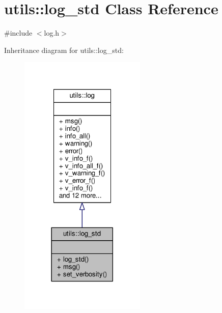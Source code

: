 \hypertarget{classutils_1_1log__std}{\section{utils\-:\-:log\-\_\-std Class Reference}
\label{classutils_1_1log__std}
}


{\ttfamily \#include $<$log.\-h$>$}



Inheritance diagram for utils\-:\-:log\-\_\-std\-:
\nopagebreak
\begin{figure}[H]
\begin{center}
\leavevmode
\includegraphics[width=170pt]{classutils_1_1log__std__inherit__graph}
\end{center}
\end{figure}


